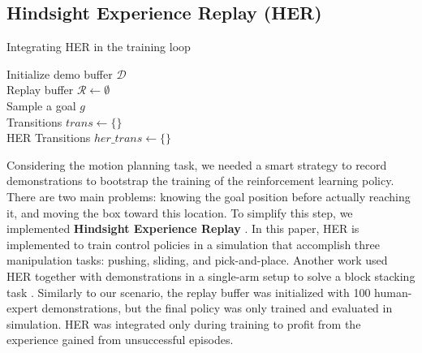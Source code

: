 \documentclass[letterpaper, 10 pt, conference]{ieeeconf}  %
\begin{document}
\subsection{Hindsight Experience Replay (HER)} \label{her}

\begin{algorithm}[t]
    \scriptsize
    \caption{Integrating HER in the training loop}
    Initialize demo buffer $\mathcal{D}$\\
    Replay buffer $\mathcal{R} \gets \emptyset$\\
    Sample a goal $g$\\
    Transitions $trans \gets \{\}$\\
    HER Transitions $her\_trans \gets \{\}$\\
    \label{her_algo}
\end{algorithm}

Considering the motion planning task, we needed a smart strategy to record demonstrations to bootstrap the training of the reinforcement learning policy. There are two main problems: knowing the goal position before actually reaching it, and moving the box toward this location. To simplify this step, we implemented \textbf{Hindsight Experience Replay} \cite{andrychowicz2018hindsightexperiencereplay}. In this paper, HER is implemented to train control policies in a simulation that accomplish three manipulation tasks: pushing, sliding, and pick-and-place. Another work used HER together with demonstrations in a single-arm setup to solve a block stacking task \cite{nair2018overcomingexplorationreinforcementlearning}. Similarly to our scenario, the replay buffer was initialized with 100 human-expert demonstrations, but the final policy was only trained and evaluated in simulation. HER was integrated only during training to profit from the experience gained from unsuccessful episodes.
\end{document}
